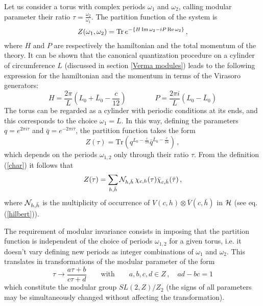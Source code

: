 \documentclass[a4paper,12pt]{report}
\begin{document}
Let us consider a torus with complex periods $\omega_{1}$ and $\omega_{2}$, calling modular parameter their ratio
$\tau=\frac{\omega_{2}}{\omega_{1}}$. The partition function of the system is
\begin{equation}
Z(\omega_{1},\omega_{2})=\textrm{Tr}\,e^{-\{H\,\footnotesize\textrm{Im}\normalsize\,\omega_{2}-iP\,\footnotesize\textrm{Re}\normalsize\,\omega_{2}\}}\,
,
\end{equation}
where $H$ and $P$ are respectively the hamiltonian and the total momentum of the theory. It can be shown that the
canonical quantization procedure on a cylinder of circumference $L$ (discussed in section \ref{Verma modules})
leads to the following expression for the hamiltonian and the momentum in terms of the Virasoro generators:
\begin{equation}\label{hamcyl}
H=\frac{2\pi}{L}\left(L_{0}+\bar{L}_{0}-\frac{c}{12}\right) \qquad \qquad P=\frac{2\pi i
}{L}\left(L_{0}-\bar{L}_{0}\right)
\end{equation}
The torus can be regarded as a cylinder with periodic conditions at its ends, and this corresponds to the choice
$\omega_{1}=L$. In this way, defining the parameters $q=e^{2\pi i \tau}$ and $\bar{q}=e^{-2\pi i \bar{\tau}}$,
the partition function takes the form
\begin{equation}\label{partfct}
Z(\tau)=\textrm{Tr}\left(q^{L_{0}-\frac{c}{24}}\bar{q}^{\bar{L}_{0}-\frac{c}{24}}\right)\,,
\end{equation}
which depends on the periods $\omega_{1,2}$ only through their ratio $\tau$. From the definition (\ref{char}) it
follows that
\begin{equation}
Z(\tau)=\sum_{h,\bar{h}}{\cal N}_{h,\bar{h}}\,\chi _{c,h }(\tau)\bar{\chi} _{c,\bar{h} }(\bar{\tau})\,,
\end{equation}
where ${\cal N}_{h,\bar{h}}$ is the multiplicity of occurrence of $V(c,h)\otimes \bar{V}(c,\bar{h})$ in ${\cal
H}$ (see eq.(\ref{hilbert})).

The requirement of modular invariance consists in imposing that the partition function is independent of the
choice of periods $\omega_{1,2}$ for a given torus, i.e. it doesn't vary defining new periods as integer
combinations of $\omega_{1}$ and $\omega_{2}$. This translates in transformations of the modular parameter of the
form
\begin{equation}
\tau\rightarrow\frac{a\tau+b}{c\tau+d}\qquad\textrm{with}\qquad a,b,c,d\in Z \,,\quad ad-bc=1
\end{equation}
which constitute the modular group $SL(2,Z)/Z_{2}$ (the signs of all parameters may be simultaneously changed
without affecting the transformation).
\end{document}
